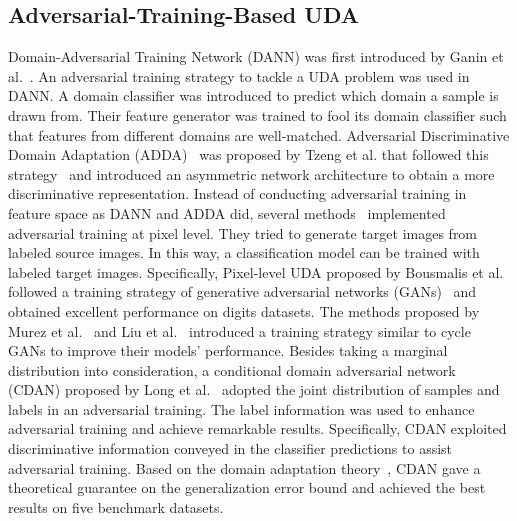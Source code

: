 \documentclass[journal,twocolumn]{IEEEtran}
\theoremstyle{definition}
\begin{document}
\subsection{Adversarial-Training-Based UDA}
Domain-Adversarial Training Network (DANN) was first introduced by Ganin et al.~\cite{ganin2016domain}. An adversarial training strategy to tackle a UDA problem was used in DANN. A domain classifier was introduced to predict which domain a sample is drawn from. Their feature generator was trained to fool its domain classifier such that features from different domains are well-matched. Adversarial Discriminative Domain Adaptation (ADDA)~\cite{tzeng2017adversarial} was proposed by Tzeng et al. that followed this strategy~\cite{ganin2016domain} and introduced an asymmetric network architecture to  obtain a more discriminative representation. Instead of  conducting adversarial training in feature space as DANN and ADDA did, several methods~\cite{liu2016coupled,bousmalis2017unsupervised,murez2018image} implemented adversarial training at pixel level. They tried to generate target images from labeled source images. In this way, a classification model can be trained with labeled target images. Specifically, Pixel-level UDA proposed by Bousmalis et al.~\cite{bousmalis2017unsupervised} followed a training strategy of generative adversarial networks (GANs)~\cite{8039016} and obtained excellent performance on digits datasets. The methods proposed by Murez et al.~\cite{murez2018image} and Liu et al.~\cite{liu2016coupled} introduced a training strategy similar to cycle GANs to improve their models' performance. Besides taking a marginal distribution into consideration, a conditional domain adversarial network (CDAN) proposed by Long et al.~\cite{long2018conditional} adopted the joint distribution of samples and labels in an adversarial training. The label information was used to enhance adversarial training and achieve remarkable results. Specifically, CDAN exploited discriminative information conveyed in the classifier predictions to assist adversarial training. Based on the domain adaptation theory~\cite{ben2010theory}, CDAN gave a theoretical guarantee on the generalization error bound and achieved the best results on five benchmark datasets.
\end{document}
